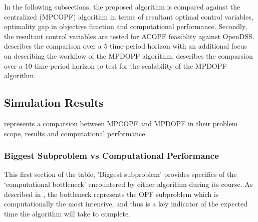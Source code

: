 \documentclass[../../outputs/main.tex]{subfiles}
\begin{document}
In the following subsections, the proposed algorithm is compared against the centralized (MPCOPF) algorithm in terms of resultant optimal control variables, optimality gap in objective function and computational performance. Secondly, the resultant control variables are tested for ACOPF feasiblity against OpenDSS.  describes the comparison over a $5$ time-period horizon with an additional focus on describing the workflow of the MPDOPF algorithm.  describes the comparsion over a $10$ time-period horizon to test for the scalability of the MPDOPF algorithm.

\subsection{Simulation Results} \label{subsec:simulationResults}

 represents a comparsion between MPCOPF and MPDOPF in their problem scope, results and computational performance.

\subsubsection{Biggest Subproblem vs Computational Performance}
This first section of the table, 'Biggest subproblem' provides specifics of the `computational bottleneck' encountered by either algorithm during its course. As described in , the bottleneck represents the OPF subproblem which is computationally the most intensive, and thus is a key indicator of the expected time the algorithm will take to complete.      
\end{document}
